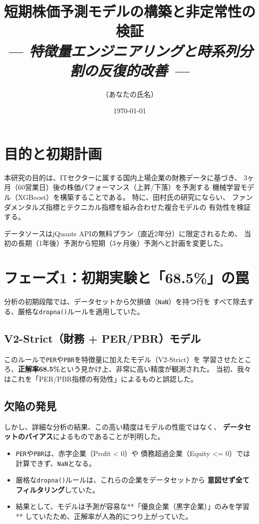 \documentclass[a4paper, 11pt]{ltjsarticle}
\title{短期株価予測モデルの構築と非定常性の検証\\
       \large \textit{--- 特徴量エンジニアリングと時系列分割の反復的改善 ---}}
\author{（あなたの氏名）}
\date{\today}
\begin{document}
\maketitle

\section{目的と初期計画}
本研究の目的は、ITセクターに属する国内上場企業の財務データに基づき、
3ヶ月（60営業日）後の株価パフォーマンス（上昇/下落）を予測する
機械学習モデル（XGBoost）を構築することである。
特に、田村氏の研究\cite{5}にならい、
ファンダメンタルズ指標とテクニカル指標を組み合わせた複合モデルの
有効性を検証する。

データソースはjQuants APIの無料プラン（直近2年分）に限定されるため、
当初の長期（1年後）予測から短期（3ヶ月後）予測へと計画を変更した。

\section{フェーズ1：初期実験と「68.5\%」の罠}
分析の初期段階では、データセットから欠損値（\texttt{NaN}）を持つ行を
すべて除去する、厳格な\texttt{dropna()}ルールを適用していた。

\subsection*{V2-Strict（財務 + PER/PBR）モデル}
このルールで\texttt{PER}や\texttt{PBR}を特徴量に加えたモデル（V2-Strict）を
学習させたところ、\textbf{正解率68.5\%}という見かけ上、非常に高い精度が観測された。
当初、我々はこれを「PER/PBR指標の有効性」によるものと誤認した。

\subsection*{欠陥の発見}
しかし、詳細な分析の結果、この高い精度はモデルの性能ではなく、
\textbf{データセットのバイアス}によるものであることが判明した。
\begin{itemize}
    \item \texttt{PER}や\texttt{PBR}は、赤字企業（Profit < 0）や
    債務超過企業（Equity \textless= 0）では計算できず、\texttt{NaN}となる。
    \item 厳格な\texttt{dropna()}ルールは、これらの企業をデータセットから
    \textbf{意図せず全てフィルタリング}していた。
    \item 結果として、モデルは予測が容易な**「優良企業（黒字企業）」のみを学習**
    していたため、正解率が人為的につり上がっていた。
\end{itemize}
\end{document}
